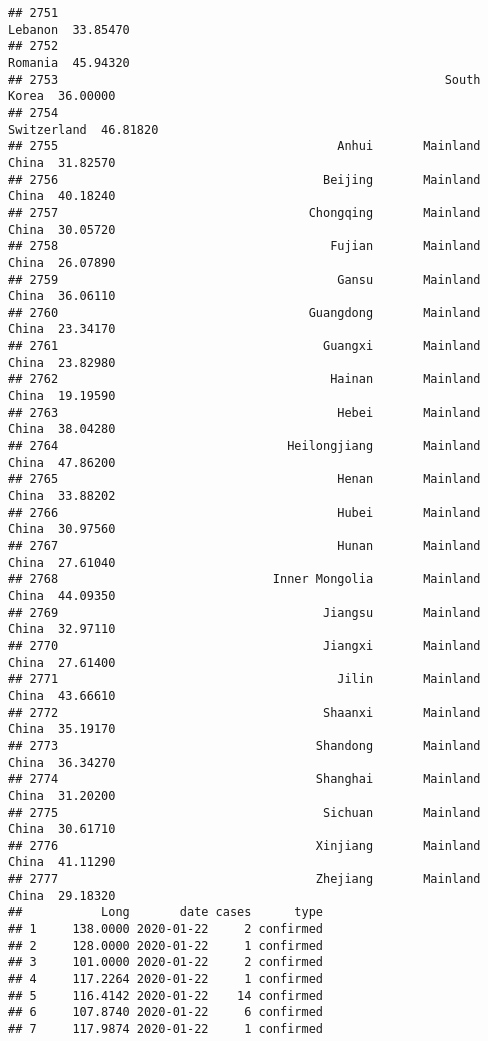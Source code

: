 \documentclass[
]{article}
\begin{document}
\begin{verbatim}
## 2751                                                          Lebanon  33.85470
## 2752                                                          Romania  45.94320
## 2753                                                      South Korea  36.00000
## 2754                                                      Switzerland  46.81820
## 2755                                       Anhui       Mainland China  31.82570
## 2756                                     Beijing       Mainland China  40.18240
## 2757                                   Chongqing       Mainland China  30.05720
## 2758                                      Fujian       Mainland China  26.07890
## 2759                                       Gansu       Mainland China  36.06110
## 2760                                   Guangdong       Mainland China  23.34170
## 2761                                     Guangxi       Mainland China  23.82980
## 2762                                      Hainan       Mainland China  19.19590
## 2763                                       Hebei       Mainland China  38.04280
## 2764                                Heilongjiang       Mainland China  47.86200
## 2765                                       Henan       Mainland China  33.88202
## 2766                                       Hubei       Mainland China  30.97560
## 2767                                       Hunan       Mainland China  27.61040
## 2768                              Inner Mongolia       Mainland China  44.09350
## 2769                                     Jiangsu       Mainland China  32.97110
## 2770                                     Jiangxi       Mainland China  27.61400
## 2771                                       Jilin       Mainland China  43.66610
## 2772                                     Shaanxi       Mainland China  35.19170
## 2773                                    Shandong       Mainland China  36.34270
## 2774                                    Shanghai       Mainland China  31.20200
## 2775                                     Sichuan       Mainland China  30.61710
## 2776                                    Xinjiang       Mainland China  41.11290
## 2777                                    Zhejiang       Mainland China  29.18320
##           Long       date cases      type
## 1     138.0000 2020-01-22     2 confirmed
## 2     128.0000 2020-01-22     1 confirmed
## 3     101.0000 2020-01-22     2 confirmed
## 4     117.2264 2020-01-22     1 confirmed
## 5     116.4142 2020-01-22    14 confirmed
## 6     107.8740 2020-01-22     6 confirmed
## 7     117.9874 2020-01-22     1 confirmed

\end{verbatim}
\end{document}
